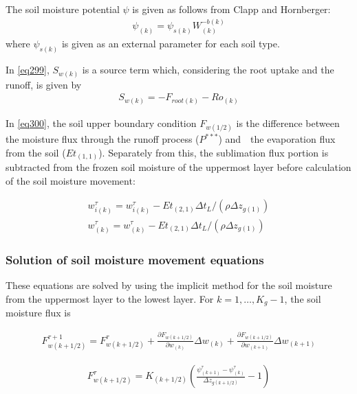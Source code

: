 The soil moisture potential \(\psi\) is given as follows from Clapp and Hornberger: \begin{eqnarray}
 \psi_{(k)} = \psi_{s(k)} W_{(k)}^{-b(k)}
\end{eqnarray} where \(\psi_{s(k)}\) is given as an external parameter for each soil type.

In \ref{eq299}, \(S_{w(k)}\) is a source term which, considering the root uptake and the runoff, is given by \begin{eqnarray}
 S_{w(k)} = - F_{root(k)} - Ro_{(k)}
\end{eqnarray}

In \ref{eq300}, the soil upper boundary condition \(F_{w(1/2)}\) is the difference between the moisture flux through the runoff process (\(P^{*** }\)) and　the evaporation flux from
the soil (\(Et_{(1,1)}\)). Separately from this, the sublimation flux portion is subtracted from the frozen soil moisture of the uppermost layer before calculation of the soil moisture movement:

\begin{eqnarray}
 w_{i(k)}^{\tau} = w_{i(k)}^{\tau} - Et_{(2,1)} \Delta t_L /(\rho \Delta z_{g(1)})\\
 w_{(k)}^{\tau} = w_{(k)}^{\tau} - Et_{(2,1)} \Delta t_L /(\rho \Delta z_{g(1)})
\end{eqnarray}

\hypertarget{solution-of-soil-moisture-movement-equations}{%
\subsubsection{Solution of soil moisture movement equations}\label{solution-of-soil-moisture-movement-equations}}

These equations are solved by using the implicit method for the soil moisture from the uppermost layer to the lowest layer. For \(k=1,\ldots,K_g-1\), the soil moisture flux is

\begin{eqnarray}
  F_{w(k+1/2)}^{\tau+1} = F_{w(k+1/2)}^{\tau}
+\frac{\partial {F}_{w(k+1/2)}}{\partial w_{(k)}}
 \Delta w_{(k)}
+\frac{\partial {F}_{w(k+1/2)}}{\partial w_{(k+1)}}
 \Delta w_{(k+1)}
\end{eqnarray}

\begin{eqnarray}
  F_{w(k+1/2)}^{\tau} =
K_{(k+1/2)} \left(\frac{\psi_{(k+1)}^{\tau} - \psi_{(k)}^{\tau}}{\Delta z_{g(k+1/2)}} - 1 \right)
\end{eqnarray}

